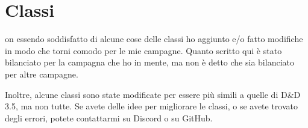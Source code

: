 \chapter{Classi}
on essendo soddisfatto di alcune cose delle classi ho aggiunto e/o fatto modifiche in modo che torni comodo per le mie campagne.
Quanto scritto qui è stato bilanciato per la campagna che ho in mente, ma non è detto che sia bilanciato per altre campagne.

Inoltre, alcune classi sono state modificate per essere più simili a quelle di D\&D 3.5, ma non tutte.
Se avete delle idee per migliorare le classi, o se avete trovato degli errori, potete contattarmi su Discord o su GitHub.



